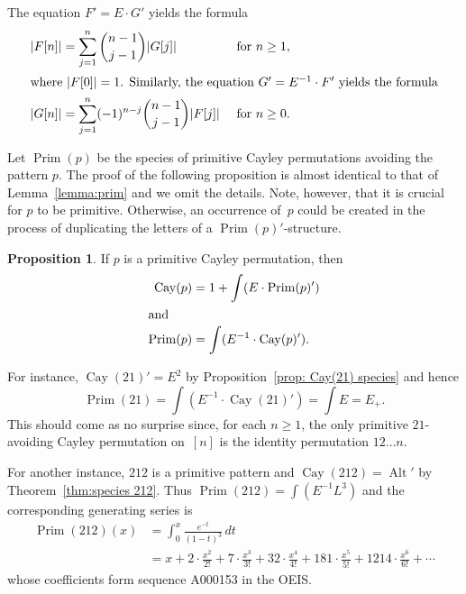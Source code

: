 \documentclass[a4paper, 11pt]{article}
\DeclareMathOperator{\Cay}{Cay}
\DeclareMathOperator{\Prim}{Prim}
\DeclareMathOperator{\Alt}{Alt}
\theoremstyle{definition}
\newtheorem{proposition}[theorem]{Proposition}
\begin{document}
The equation $F'=E\cdot G'$ yields the formula
\begin{align}
  |F[n]| &= \sum_{j=1}^{n}\binom{n-1}{j-1} |G[j]| &&\text{ for } n\geq 1, \label{eq: F from G}\\
  \intertext{where $|F[0]|=1$. Similarly, the equation $G'=E^{-1}\cdot F'$ yields the formula}
  |G[n]| &= \sum_{j=1}^{n}(-1)^{n-j}\binom{n-1}{j-1} |F[j]| &&\text{ for } n\geq 0. \label{eq: G from F}
\end{align}

Let $\Prim(p)$ be the species of primitive Cayley permutations avoiding
the pattern $p$. The proof of the following proposition is almost
identical to that of Lemma~\ref{lemma:prim} and we omit the
details. Note, however, that it is crucial for $p$ to be primitive.
Otherwise, an occurrence of~$p$ could be created in the process of
duplicating the letters of a $\Prim(p)'$-structure.

\begin{proposition}\label{prop: Prim(p)}
  If $p$ is a primitive Cayley permutation, then
  \begin{align*}
    \Cay(p) &= 1 + \int (E\cdot \Prim(p)') \\
    \shortintertext{and}
    \Prim(p) &= \int (E^{-1}\cdot \Cay(p)').
  \end{align*}
\end{proposition}

For instance, $\Cay(21)'=E^2$ by Proposition~\ref{prop: Cay(21) species}
and hence
\[
  \Prim(21) = \int (E^{-1}\cdot \Cay(21)') = \int E = E_+.
\]
This should come as no surprise since, for each $n \geq 1$, the only
primitive $21$-avoiding Cayley permutation on~$[n]$ is the identity
permutation $12\ldots n$.

For another instance, $212$ is a primitive pattern and
$\Cay(212) = \Alt'$ by Theorem~\ref{thm:species 212}. Thus
$\Prim(212) = \int (E^{-1}L^3)$ and the corresponding generating series is
\begin{align*}
  \Prim(212)(x)
  &= \int_0^x \frac{e^{-t}}{(1-t)^3}\,dt \\
  &= x + 2\cdot\frac{x^2}{2!} + 7\cdot\frac{x^3}{3!} + 32\cdot\frac{x^4}{4!}
    + 181\cdot\frac{x^5}{5!} + 1214\cdot \frac{x^6}{6!} + \cdots
\end{align*}
whose coefficients form sequence A000153 in the OEIS.
\end{document}
